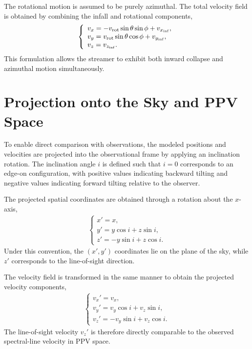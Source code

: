 The rotational motion is assumed to be purely azimuthal. The total velocity field is obtained by combining the infall and rotational components,
\begin{align}
    \left\{
    \begin{array}{l}
         v_x = -v_{\rm rot}\sin\theta \sin\phi + v_{x_{\rm inf}}, \\
         v_y =  v_{\rm rot}\sin\theta \cos\phi + v_{y_{\rm inf}}, \\
         v_z =  v_{z_{\rm inf}}.
    \end{array}
    \right.
\end{align}
This formulation allows the streamer to exhibit both inward collapse and azimuthal motion simultaneously.

\section{Projection onto the Sky and PPV Space}
To enable direct comparison with observations, the modeled positions and velocities are projected into the observational frame by applying an inclination rotation. The inclination angle $i$ is defined such that $i=0$ corresponds to an edge-on configuration, with positive values indicating backward tilting and negative values indicating forward tilting relative to the observer.

The projected spatial coordinates are obtained through a rotation about the $x$-axis,
\begin{align}
    \left\{
    \begin{array}{l}
     x' = x, \\
     y' = y\cos i + z\sin i, \\
     z' = -y\sin i + z\cos i.
    \end{array}
    \right.
\end{align}
Under this convention, the $(x',y')$ coordinates lie on the plane of the sky, while $z'$ corresponds to the line-of-sight direction.

The velocity field is transformed in the same manner to obtain the projected velocity components,
\begin{align}
    \left\{
    \begin{array}{l}
        v_x' = v_x, \\[4pt]
        v_y' = v_y\cos i + v_z\sin i, \\[4pt]
        v_z' = -v_y\sin i + v_z\cos i.
    \end{array}
    \right.
\end{align}
The line-of-sight velocity $v_z'$ is therefore directly comparable to the observed spectral-line velocity in PPV space.


